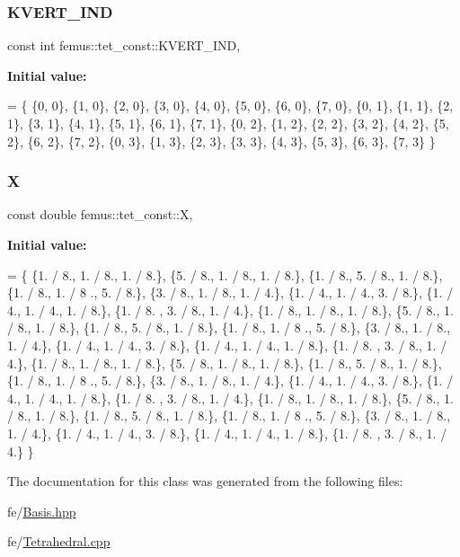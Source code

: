 \subsubsection{\texorpdfstring{K\+V\+E\+R\+T\+\_\+\+I\+ND}{KVERT\_IND}}
{\footnotesize\ttfamily const int femus\+::tet\+\_\+const\+::\+K\+V\+E\+R\+T\+\_\+\+I\+ND\hspace{0.3cm}{\ttfamily [static]}, {\ttfamily [protected]}}

{\bfseries Initial value\+:}
\begin{DoxyCode}
= \{
    \{0, 0\}, \{1, 0\}, \{2, 0\}, \{3, 0\}, \{4, 0\}, \{5, 0\}, \{6, 0\}, \{7, 0\},
    \{0, 1\}, \{1, 1\}, \{2, 1\}, \{3, 1\}, \{4, 1\}, \{5, 1\}, \{6, 1\}, \{7, 1\},
    \{0, 2\}, \{1, 2\}, \{2, 2\}, \{3, 2\}, \{4, 2\}, \{5, 2\}, \{6, 2\}, \{7, 2\},
    \{0, 3\}, \{1, 3\}, \{2, 3\}, \{3, 3\}, \{4, 3\}, \{5, 3\}, \{6, 3\}, \{7, 3\}
  \}
\end{DoxyCode}
\mbox{\label{classfemus_1_1tet__const_afde27b9828f3132102727969c8ab0315}} 
\subsubsection{\texorpdfstring{X}{X}}
{\footnotesize\ttfamily const double femus\+::tet\+\_\+const\+::X\hspace{0.3cm}{\ttfamily [static]}, {\ttfamily [protected]}}

{\bfseries Initial value\+:}
\begin{DoxyCode}
= \{
    \{1. / 8., 1. / 8., 1. / 8.\}, \{5. / 8., 1. / 8., 1. / 8.\}, \{1. / 8., 5. / 8., 1. / 8.\}, \{1. / 8., 1. / 8
      ., 5. / 8.\}, \{3. / 8., 1. / 8., 1. / 4.\}, \{1. / 4., 1. / 4., 3. / 8.\}, \{1. / 4., 1. / 4., 1. / 8.\}, \{1. / 8.
      , 3. / 8., 1. / 4.\},
    \{1. / 8., 1. / 8., 1. / 8.\}, \{5. / 8., 1. / 8., 1. / 8.\}, \{1. / 8., 5. / 8., 1. / 8.\}, \{1. / 8., 1. / 8
      ., 5. / 8.\}, \{3. / 8., 1. / 8., 1. / 4.\}, \{1. / 4., 1. / 4., 3. / 8.\}, \{1. / 4., 1. / 4., 1. / 8.\}, \{1. / 8.
      , 3. / 8., 1. / 4.\},
    \{1. / 8., 1. / 8., 1. / 8.\}, \{5. / 8., 1. / 8., 1. / 8.\}, \{1. / 8., 5. / 8., 1. / 8.\}, \{1. / 8., 1. / 8
      ., 5. / 8.\}, \{3. / 8., 1. / 8., 1. / 4.\}, \{1. / 4., 1. / 4., 3. / 8.\}, \{1. / 4., 1. / 4., 1. / 8.\}, \{1. / 8.
      , 3. / 8., 1. / 4.\},
    \{1. / 8., 1. / 8., 1. / 8.\}, \{5. / 8., 1. / 8., 1. / 8.\}, \{1. / 8., 5. / 8., 1. / 8.\}, \{1. / 8., 1. / 8
      ., 5. / 8.\}, \{3. / 8., 1. / 8., 1. / 4.\}, \{1. / 4., 1. / 4., 3. / 8.\}, \{1. / 4., 1. / 4., 1. / 8.\}, \{1. / 8.
      , 3. / 8., 1. / 4.\}
  \}
\end{DoxyCode}


The documentation for this class was generated from the following files\+:\begin{DoxyCompactItemize}
\item 
fe/\mbox{\hyperlink{_basis_8hpp}{Basis.\+hpp}}\item 
fe/\mbox{\hyperlink{_tetrahedral_8cpp}{Tetrahedral.\+cpp}}\end{DoxyCompactItemize}
